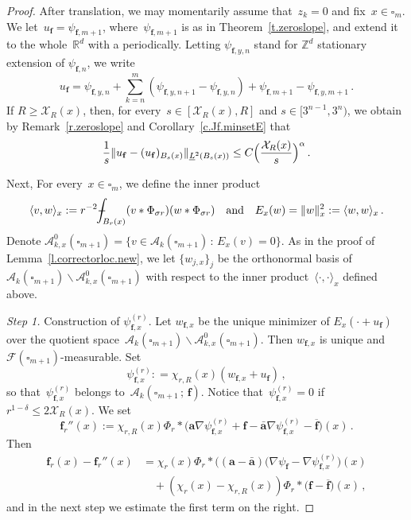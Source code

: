 \documentclass[11pt]{article} %
\let\oldsquare\square %
\renewcommand{\square}{\oldsquare}
\numberwithin{equation}{section}
\theoremstyle{definition}
\newcommand*{\Z}{\ensuremath{\mathbb{Z}}}
\newcommand*{\R}{\ensuremath{\mathbb{R}}}
\newcommand{\qand}{\quad \mbox{and} \quad }
\newcommand{\f}{\mathbf{f}}
\renewcommand{\a}{\mathbf{a}}
\newcommand{\ahom}{\bar{\a}}
\newcommand{\cu}{\square}
\newcommand{\F}{\mathcal{F}}
\newcommand{\X}{\mathcal{X}}
\newcommand{\indc}{1}
\newcommand{\minscale}{\chi}
\def\Xint#1{\mathchoice
{\XXint\displaystyle\textstyle{#1}}%
{\XXint\textstyle\scriptstyle{#1}}%
{\XXint\scriptstyle\scriptscriptstyle{#1}}%
{\XXint\scriptscriptstyle\scriptscriptstyle{#1}}%
\!\int}
\def\XXint#1#2#3{{\setbox0=\hbox{$#1{#2#3}{\int}$}
\vcenter{\hbox{$#2#3$}}\kern-.5\wd0}}
\def\fint{\Xint-}
\newcommand{\A}{\mathcal{A}}
\begin{document}
\begin{proof}
\smallskip 

After translation, we may momentarily assume that~$z_k = 0$ and fix~$x \in \cu_m$.  We let~$u_{\f} = \psi_{\f,m+1}$, where~$\psi_{\f,m+1}$ is as in Theorem~\ref{t.zeroslope}, and extend it to the whole~$\R^d$ with a periodically. Letting $\psi_{\f,y,n}$ stand for $\Z^d$ stationary extension of $\psi_{\f,n}$, we write  
\begin{equation*}  
u_\f 
= 
\psi_{\f,y,n} 
+ \sum_{k=n}^{m} (\psi_{\f,y,n+1}  - \psi_{\f,y,n}) 
+ \psi_{\f,m+1} - \psi_{\f,y,m+1}\,.
\end{equation*}
If $R \geq \X_R(x)$, then, for every~$s \in [\X_R(x),R]$ and $s \in [3^{n-1},3^{n})$, we obtain by Remark~\ref{r.zeroslope} and Corollary~\ref{c.Jf.minsetE} that 
\begin{equation}  \label{e.fr.localization.minscale.prop}
\frac1s \| u_{\f} - (u_{\f})_{B_s(x)}  \|_{\underline{L}^2(B_s(x))}  
\leq 
C 
\Bigl( \frac{\X_R(x)}{s}  \Bigr)^\alpha
\,.
\end{equation}

\smallskip

Next, For every~$x \in \cu_m$, we define the inner product
\begin{align}  \label{e.fr.innerproduct}
\langle v,w\rangle_x
:= 
r^{-2}
\fint_{ B_{r}(x) } (v \ast \Phi_{\sigma r}) (w \ast \Phi_{\sigma r})
\qand
E_x(w) = \| w\|_x^2 := \langle w,w\rangle_x
\,. 
\end{align}
Denote $\A_{k,x}^{0}(\cu_{m+1}) = \{ v \in \A_k(\cu_{m+1}) \, : \, E_x(v) = 0 \}$. As in the proof of Lemma~\ref{l.correctorloc.new}, we let $\{w_{j,x}\}_j$ be the orthonormal basis of~$\A_{k}(\cu_{m+1}) \backslash \A_{k,x}^0(\cu_{m+1})$ with respect to the inner product~$\langle \cdot , \cdot \rangle_x$ defined above. 

\smallskip

\emph{Step 1.} Construction of $\psi_{\f,x}^{(r)}$.  Let $w_{\f,x}$ be the unique minimizer of $E_x(\cdot + u_\f)$ over the quotient space~$\A_{k}(\cu_{m+1}) \backslash \A_{k,x}^0(\cu_{m+1})$.  Then $w_{\f,x}$ is unique and~$\F(\cu_{m+1})$-measurable.  Set 
\begin{equation}  \label{e.fr.localcorrdef}
\psi_{\f,x}^{(r)}  : = \minscale_{r,R}(x)( w_{\f,x} + u_\f) 
\,,
\end{equation}
so that~$\psi_{\f,x}^{(r)}$ belongs to~$\A_k(\cu_{m+1}\, ; \, \f)$. Notice that~$\psi_{\f,x}^{(r)} = 0$ if~$r^{1-\delta} \leq 2\X_{R}(x)$. We set
\begin{equation*}  
\f_{r}''(x) 
:= 
\minscale_{r,R}(x) \Phi_r \ast  \bigl( \a \nabla \psi_{\f,x}^{(r)}  + \f - \ahom \nabla \psi_{\f,x}^{(r)} - \overline{\f}  \bigr) (x) \,.
\end{equation*}
Then
\begin{align*}  
\f_r(x) - \f_{r}''(x)
& = 
\minscale_{r}(x) \Phi_r \ast  \bigl( (\a - \ahom)( \nabla \psi_{\f}  -  \nabla \psi_{\f,x}^{(r)}  \bigr) (x) 
\\ & \quad 
+ 
(\minscale_{r}(x)-\minscale_{r,R}(x)) \Phi_r \ast  \bigl( \f - \overline{\f}  \bigr) (x)\,,
\end{align*}
and in the next step we estimate the first term on the right. 



\end{proof}
\end{document}
